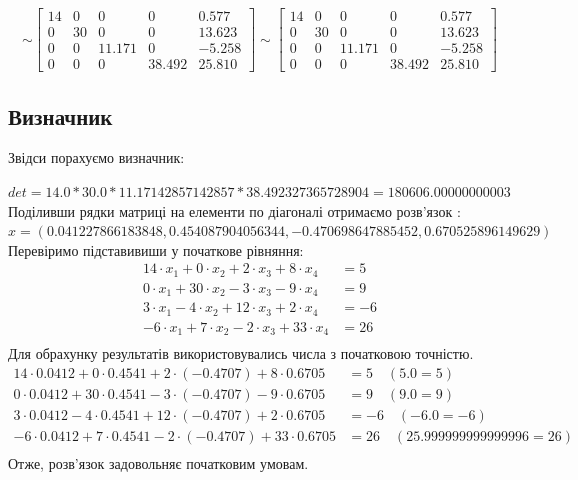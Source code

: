 \documentclass[a4paper, 12pt]{article}
\begin{document}
\[
\sim
\left[
\begin{array}{cccc|c}
14 & 0 & 0 & 0 & 0.577 \\
0 & 30 & 0 & 0 & 13.623 \\
0 & 0 & 11.171 & 0 & -5.258 \\
0 & 0 & 0 & 38.492 & 25.810
\end{array}
\right] 
\sim 
\left[
\begin{array}{cccc|c}
14 & 0 & 0 & 0 & 0.577 \\
0 & 30 & 0 & 0 & 13.623 \\
0 & 0 & 11.171 & 0 & -5.258 \\
0 & 0 & 0 & 38.492 & 25.810
\end{array}
\right]
\]

\subsection*{Визначник}
Звідси порахуємо визначник:

\(det = 14.0*30.0*11.17142857142857*38.492327365728904 = 180606.00000000003 \) \\ 

Поділивши рядки матриці на елементи по діагоналі отримаємо розв'язок : \\ 
\(x = (0.041227866183848, 0.454087904056344,  -0.470698647885452, 0.670525896149629)\) \\ 

Перевіримо підставивиши у початкове рівняння: 
\[ 
\begin{aligned}
14 \cdot x_1 + 0 \cdot x_2 + 2 \cdot x_3 + 8 \cdot x_4 &= 5 \\
 0 \cdot x_1 + 30 \cdot x_2 - 3 \cdot x_3 - 9 \cdot x_4 &= 9 \\
 3 \cdot x_1 - 4 \cdot x_2 + 12 \cdot x_3 + 2 \cdot x_4 &= -6 \\
 -6 \cdot x_1 + 7 \cdot x_2 - 2 \cdot x_3 + 33 \cdot x_4 &= 26 \\
 \end{aligned} \] 
 Для обрахунку результатів використовувались числа з початковою точністю.
 \[ 
 \begin{aligned}
 14 \cdot 0.0412 + 0 \cdot 0.4541 + 2 \cdot (-0.4707) + 8 \cdot 0.6705 &= 5 \quad (5.0 = 5) \\
 0 \cdot 0.0412 + 30 \cdot 0.4541 - 3 \cdot (-0.4707) - 9 \cdot 0.6705 &= 9 \quad (9.0 = 9) \\
 3 \cdot 0.0412 - 4 \cdot 0.4541 + 12 \cdot (-0.4707) + 2 \cdot 0.6705 &= -6 \quad (-6.0 = -6) \\
 -6 \cdot 0.0412 + 7 \cdot 0.4541 - 2 \cdot (-0.4707) + 33 \cdot 0.6705 &= 26 \quad (25.999999999999996 = 26) \\
 \end{aligned}
\]
Отже, розв'язок задовольняє початковим умовам.
\end{document}
